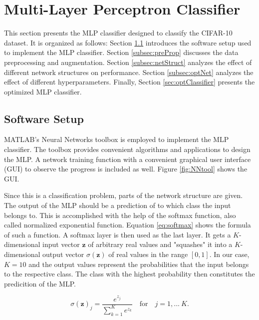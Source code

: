 \section{Multi-Layer Perceptron Classifier}\label{sec:MLP}
	    \pagestyle{mario}

This section presents the MLP classifier designed to classify the CIFAR-10 dataset. It is organized as follows: Section \ref{subsec:setup} introduces the software setup used to implement the MLP classifier. Section \ref{subsec:preProp} discusses the data preprocessing and augmentation. Section \ref{subsec:netStruct} analyzes the effect of different network structures on performance. Section \ref{subsec:optNet} analyzes the effect of different hyperparameters. Finally, Section \ref{sec:optClassifier} presents the optimized MLP classifier.

\subsection{Software Setup}\label{subsec:setup}

MATLAB's Neural Networks toolbox is employed to implement the MLP classifier. The toolbox provides convenient algorithms and applications to design the MLP. A network training function with a convenient graphical user interface (GUI) to observe the progress is included as well. Figure \ref{fig:NNtool} shows the GUI.

Since this is a classification problem, parts of the network structure are given. The output of the MLP should be a prediction of to which class the input belongs to. This is accomplished with the help of the softmax function, also called normalized exponential function. Equation \ref{eq:softmax} shows the formula of such a function. A softmax layer is then used as the last layer. It gets a $K$-dimensional input vector $\boldsymbol{z}$ of arbitrary real values and "squashes" it into a $K$-dimensional output vector $\sigma(\boldsymbol{z})$ of real values in the range $[0,1]$. In our case, $K=10$ and the output values represent the probabilities that the input belongs to the respective class. The class with the highest probability then constitutes the predicition of the MLP.

\begin{equation}\label{eq:softmax}
\sigma(\boldsymbol{z})_j = \frac{e^{z_j}}{\sum_{k=1}^{K}e^{z_k}}\quad \textrm{for}\quad j = 1,...~K.
\end{equation}

